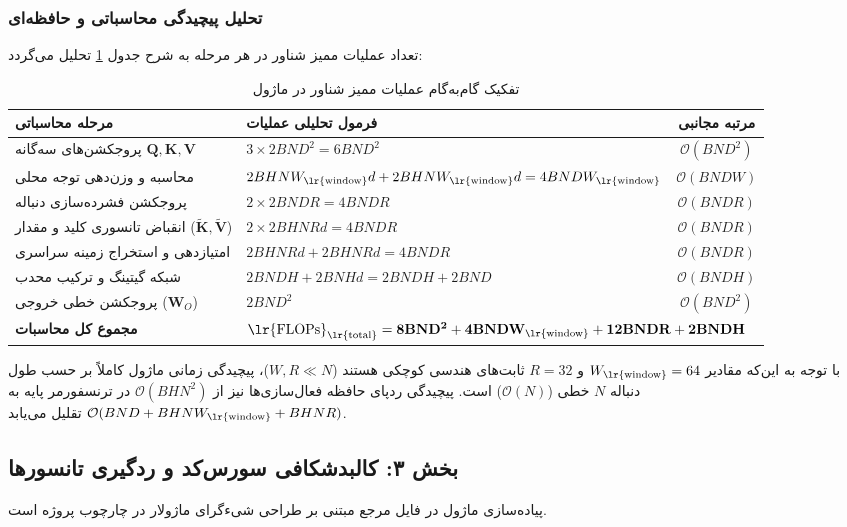 \subsubsection*{تحلیل پیچیدگی محاسباتی و حافظه‌ای}
تعداد عملیات ممیز شناور  در هر مرحله به شرح جدول \ref{tab:flops_breakdown_oha} تحلیل می‌گردد:
\begin{table}[H]
\centering
\small
\caption{تفکیک گام‌به‌گام عملیات ممیز شناور  در ماژول }
\label{tab:flops_breakdown_oha}
\begin{tabular}{llc}
\toprule
\textbf{مرحله محاسباتی} & \textbf{فرمول تحلیلی عملیات} & \textbf{مرتبه مجانبی} \\
\midrule
پروجکشن‌های سه‌گانه $\mathbf{Q}, \mathbf{K}, \mathbf{V}$ & $3 \times 2 B N D^2 = 6 B N D^2$ & $\mathcal{O}(B N D^2)$ \\
محاسبه و وزن‌دهی توجه محلی & $2 B H N W_{\text{\lr{window}}} d + 2 B H N W_{\text{\lr{window}}} d = 4 B N D W_{\text{\lr{window}}}$ & $\mathcal{O}(B N D W)$ \\
پروجکشن فشرده‌سازی دنباله & $2 \times 2 B N D R = 4 B N D R$ & $\mathcal{O}(B N D R)$ \\
انقباض تانسوری کلید و مقدار ($\widetilde{\mathbf{K}}, \widetilde{\mathbf{V}}$) & $2 \times 2 B H N R d = 4 B N D R$ & $\mathcal{O}(B N D R)$ \\
امتیازدهی و استخراج زمینه سراسری & $2 B H N R d + 2 B H N R d = 4 B N D R$ & $\mathcal{O}(B N D R)$ \\
شبکه گیتینگ و ترکیب محدب & $2 B N D H + 2 B N H d = 2 B N D H + 2 B N D$ & $\mathcal{O}(B N D H)$ \\
پروجکشن خطی خروجی ($\mathbf{W}_O$) & $2 B N D^2$ & $\mathcal{O}(B N D^2)$ \\
\midrule
\textbf{مجموع کل محاسبات} & \multicolumn{2}{l}{$\mathbf{\text{\lr{FLOPs}}_{\text{\lr{total}}} = 8 B N D^2 + 4 B N D W_{\text{\lr{window}}} + 12 B N D R + 2 B N D H}$} \\
\bottomrule
\end{tabular}
\end{table}

با توجه به این‌که مقادیر $W_{\text{\lr{window}}} = 64$ و $R = 32$ ثابت‌های هندسی کوچکی هستند ($W, R \ll N$)، پیچیدگی زمانی ماژول کاملاً بر حسب طول دنباله $N$ خطی ($\mathcal{O}(N)$) است. پیچیدگی ردپای حافظه فعال‌سازی‌ها نیز از $\mathcal{O}(B H N^2)$ در ترنسفورمر پایه به $\mathcal{O}(B N D + B H N W_{\text{\lr{window}}} + B H N R)$ تقلیل می‌یابد.

\subsection*{بخش ۳: کالبدشکافی سورس‌کد و ردگیری تانسورها }
پیاده‌سازی ماژول در فایل مرجع  مبتنی بر طراحی شیءگرای ماژولار در چارچوب پروژه است.

